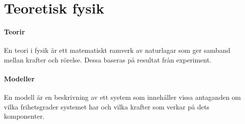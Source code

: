 \section{Teoretisk fysik}

\paragraph{Teorir}
En teori i fysik är ett matematiskt ramverk av naturlagar som ger samband mellan krafter och rörelse. Dessa baseras på resultat från experiment.

\paragraph{Modeller}
En modell är en beskrivning av ett system som innehåller vissa antaganden om vilka frihetsgrader systemet har och vilka krafter som verkar på dets komponenter.
